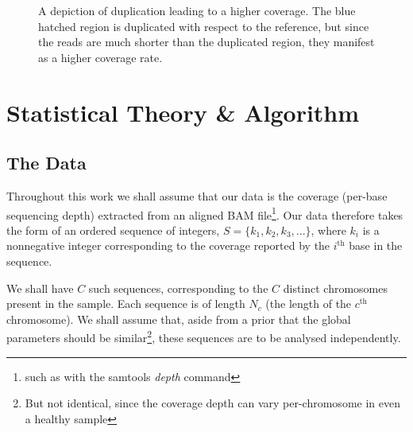 \documentclass[fleqn,usenatbib]{acmart}
\begin{document}
\begin{figure}
\begin{center}
{
				}
			\end{center}\caption{A depiction of duplication leading to a higher coverage. The blue hatched region is duplicated with respect to the reference, but since the reads are much shorter than the duplicated region, they manifest as a higher coverage rate.}\label{Fig:Diagram}
		\end{figure}

	\section{Statistical Theory \& Algorithm}

		\subsection*{The Data}

			Throughout this work we shall assume that our data is the coverage (per-base sequencing depth) extracted from an aligned BAM file\footnote{such as with the samtools \textit{depth} command}. Our data therefore takes the form of an ordered sequence of integers, $S = \{k_1,k_2,k_3,...\}$, where $k_i$ is a nonnegative integer corresponding to the coverage reported by the $i^\text{th}$ base in the sequence.
			
			We shall have $C$ such sequences, corresponding to the $C$ {distinct} chromosomes present in the sample. Each sequence is of length $N_c$ (the length of the $c^\text{th}$ chromosome). We shall assume that, aside from a prior that the global parameters should be similar\footnote{But not identical, since the coverage depth can vary per-chromosome in even a healthy sample}, these sequences are to be analysed independently.
\end{document}

